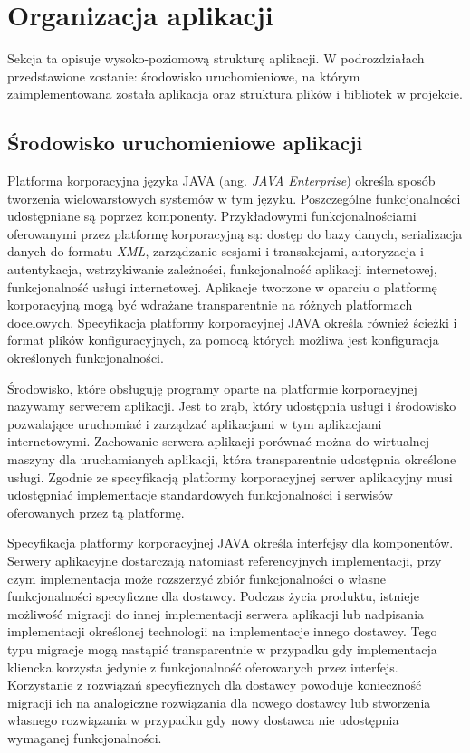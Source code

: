 \section{Organizacja aplikacji}
Sekcja ta opisuje wysoko-poziomową strukturę aplikacji. W podrozdziałach przedstawione zostanie: środowisko uruchomieniowe, na którym zaimplementowana została aplikacja oraz struktura plików i bibliotek w projekcie.
\subsection{Środowisko uruchomieniowe aplikacji}
Platforma korporacyjna języka JAVA (ang. \textit{JAVA Enterprise}) określa sposób tworzenia wielowarstowych systemów w tym języku. Poszczególne funkcjonalności udostępniane są poprzez komponenty.  Przykładowymi funkcjonalnościami oferowanymi przez platformę korporacyjną są: dostęp do bazy danych, serializacja danych do formatu \textit{XML}, zarządzanie sesjami i transakcjami, autoryzacja i autentykacja, wstrzykiwanie zależności, funkcjonalność aplikacji internetowej, funkcjonalność usługi internetowej. Aplikacje tworzone w oparciu o platformę korporacyjną mogą być wdrażane transparentnie na różnych platformach docelowych. Specyfikacja platformy korporacyjnej JAVA określa również ścieżki i format plików konfiguracyjnych, za pomocą których możliwa jest konfiguracja określonych funkcjonalności.

Środowisko, które obsługuję programy oparte na platformie korporacyjnej nazywamy serwerem aplikacji. Jest to zrąb, który udostępnia usługi i środowisko pozwalające uruchomiać i zarządzać aplikacjami w tym aplikacjami internetowymi. Zachowanie serwera aplikacji porównać można do wirtualnej maszyny dla uruchamianych aplikacji, która transparentnie udostępnia określone usługi. Zgodnie ze specyfikacją platformy korporacyjnej serwer aplikacyjny musi udostępniać implementacje standardowych funkcjonalności i serwisów oferowanych przez tą platformę. 

Specyfikacja platformy korporacyjnej JAVA określa interfejsy dla komponentów. Serwery aplikacyjne dostarczają natomiast referencyjnych implementacji, przy czym implementacja może rozszerzyć zbiór funkcjonalności o własne funkcjonalności specyficzne dla dostawcy. Podczas życia produktu, istnieje możliwość migracji do innej implementacji serwera aplikacji lub nadpisania implementacji określonej technologii na implementacje innego dostawcy. Tego typu migracje mogą nastąpić transparentnie w przypadku gdy implementacja kliencka korzysta jedynie z funkcjonalność oferowanych przez interfejs. Korzystanie z rozwiązań specyficznych dla dostawcy powoduje konieczność migracji ich na analogiczne rozwiązania dla nowego dostawcy lub stworzenia własnego rozwiązania w przypadku gdy nowy dostawca nie udostępnia wymaganej funkcjonalności.

